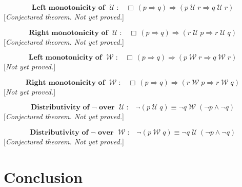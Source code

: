 \documentclass[fleqn, leqno]{article}
\newcommand{\impl}{\ensuremath{\Rightarrow}}        %
\newcommand{\Until}{\;\mathcal{U}\;}
\newcommand{\Wait}{\;\mathcal{W}\;}
\newcommand{\Always}{\Box\,}
\begin{document}
\begin{equation}\label{E:leftMonoUntil}
\textbf{Left monotonicity of $\Until$:}\quad \Always (p \impl q) \impl (p \Until r \impl q \Until r)
\end{equation}
[\textit{Conjectured theorem. Not yet proved.}]

\begin{equation}\label{E:rightMonoUntil}
\textbf{Right monotonicity of $\Until$:}\quad \Always (p \impl q) \impl (r \Until p \impl r \Until q)
\end{equation}
[\textit{Conjectured theorem. Not yet proved.}]

\begin{equation}\label{E:leftMonoWait}
\textbf{Left monotonicity of $\Wait$:}\quad \Always (p \impl q) \impl (p \Wait r \impl q \Wait r)
\end{equation}
[\textit{Not yet proved.}]

\begin{equation}\label{E:rightMonoWait}
\textbf{Right monotonicity of $\Wait$:}\quad \Always (p \impl q) \impl (r \Wait p \impl r \Wait q)
\end{equation}
[\textit{Not yet proved.}]

\begin{equation}\label{E:notUntil}
\textbf{Distributivity of $\neg$ over $\Until$:}\quad \neg (p \Until q) \equiv \neg q \Wait (\neg p \land \neg q)
\end{equation}
[\textit{Conjectured theorem. Not yet proved.}]

\begin{equation}\label{E:notWait}
\textbf{Distributivity of $\neg$ over $\Wait$:}\quad \neg (p \Wait q) \equiv \neg q \Until (\neg p \land \neg q)
\end{equation}
[\textit{Conjectured theorem. Not yet proved.}]

\section{Conclusion}
\end{document}
